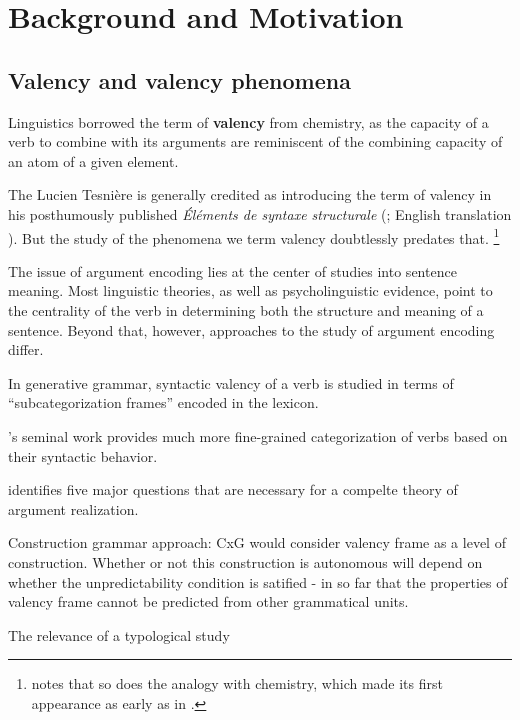 \section{Background and Motivation}

\subsection{Valency and valency phenomena}


Linguistics borrowed the term of \textbf{valency} from chemistry, as the capacity of a verb to combine with its arguments are reminiscent of the combining capacity of an atom of a given element.

The Lucien Tesnière is generally credited as introducing the term of valency in his posthumously published \textit{Éléments de syntaxe structurale} (\cite*{tesniere1959}; English translation \cite*{tesniere2015}). But the study of the phenomena we term valency doubtlessly predates that. \footnote{
    \citet{przepiorkowski2018} notes that so does the analogy with chemistry, which made its first appearance as early as in \citet{peirce1897}.
}

The issue of argument encoding lies at the center of studies into sentence meaning. Most linguistic theories, as well as psycholinguistic evidence, point to the centrality of the verb in determining both the structure and meaning of a sentence. Beyond that, however, approaches to the study of argument encoding differ.

In generative grammar, syntactic valency of a verb is studied in terms of ``subcategorization frames'' encoded in the lexicon. 

\citet{levin1993}'s seminal work provides much more fine-grained categorization of verbs based on their syntactic behavior. 

\citep{fillmore1967,fillmore1970} 

\citet{levin2005} identifies five major questions that are necessary for a compelte theory of argument realization.

Construction grammar approach:
CxG would consider valency frame as a level of construction. Whether or not this construction is autonomous will depend on whether the unpredictability condition is satified - in so far that the properties of valency frame cannot be predicted from other grammatical units.

The relevance of a typological study 

